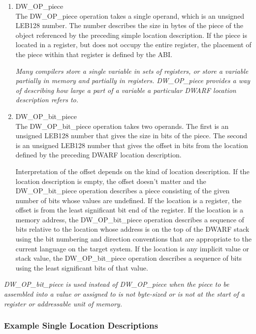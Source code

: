 \begin{enumerate}[1]
\item DW\_OP\_piece \\
The DW\_OP\_piece operation takes a single operand, which is an
unsigned LEB128 number.  The number describes the size in bytes
of the piece of the object referenced by the preceding simple
location description. If the piece is located in a register,
but does not occupy the entire register, the placement of
the piece within that register is defined by the ABI.

\textit{Many compilers store a single variable in sets of registers,
or store a variable partially in memory and partially in
registers. DW\_OP\_piece provides a way of describing how large
a part of a variable a particular DWARF location description
refers to. }

\item DW\_OP\_bit\_piece \\
The DW\_OP\_bit\_piece operation takes two operands. The first
is an unsigned LEB128 number that gives the size in bits
of the piece. The second is an unsigned LEB128 number that
gives the offset in bits from the location defined by the
preceding DWARF location description.  

Interpretation of the
offset depends on the kind of location description. If the
location description is empty, the offset doesn’t matter and
the DW\_OP\_bit\_piece operation describes a piece consisting
of the given number of bits whose values are undefined. If
the location is a register, the offset is from the least
significant bit end of the register. If the location is a
memory address, the DW\_OP\_bit\_piece operation describes a
sequence of bits relative to the location whose address is
on the top of the DWARF stack using the bit numbering and
direction conventions that are appropriate to the current
language on the target system. If the location is any implicit
value or stack value, the DW\_OP\_bit\_piece operation describes
a sequence of bits using the least significant bits of that
value.  
\end{enumerate}

\textit{DW\_OP\_bit\_piece is used instead of DW\_OP\_piece when
the piece to be assembled into a value or assigned to is not
byte-sized or is not at the start of a register or addressable
unit of memory.}




\subsubsection{Example Single Location Descriptions}

